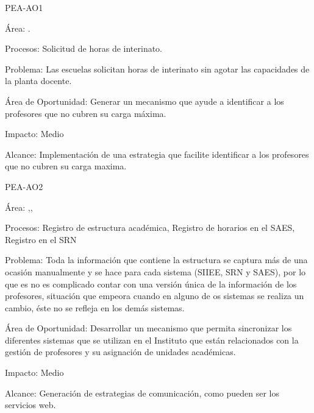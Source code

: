 \begin{AreaOportunidad}{PEA-AO1}
	\item[Área:] .
	\item[Procesos:] Solicitud de horas de interinato.
	\item[Problema:] Las escuelas solicitan horas de interinato sin agotar las capacidades de la planta docente.
	\item[Área de Oportunidad:] Generar un mecanismo que ayude a identificar a los profesores que no cubren su carga máxima.
		\item[Impacto:] Medio
	\item[Alcance:] Implementación de una estrategia que facilite identificar a los profesores que no cubren su carga maxima.
	\end{AreaOportunidad}



\begin{AreaOportunidad}{PEA-AO2}
	\item[Área:] ,,
	\item[Procesos:] Registro de estructura académica, Registro de horarios en el SAES, Registro en el SRN
	\item[Problema:] Toda la información que contiene la estructura se captura más de una ocasión manualmente y se hace para cada sistema (SIIEE, SRN y SAES), por lo que es no es complicado contar con una versión única de la información de los profesores, situación que empeora cuando en alguno de os sistemas se realiza un cambio, éste no se refleja en los demás sistemas.	
		\item[Área de Oportunidad:]Desarrollar un mecanismo que permita sincronizar los diferentes sistemas que se utilizan en el Instituto que están relacionados con la gestión de profesores y su asignación de unidades académicas.
	\item[Impacto:] Medio
	\item[Alcance:] Generación de estrategias de comunicación, como pueden ser los servicios web.
\end{AreaOportunidad}

